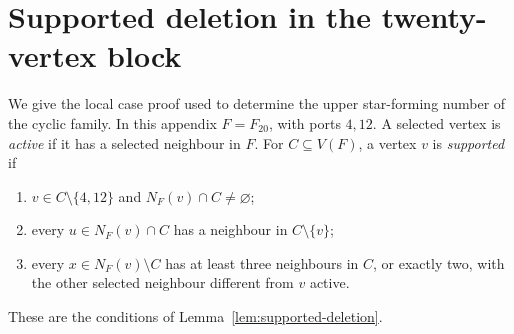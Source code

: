 \section{Supported deletion in the twenty-vertex block}\label{app:twenty-support}

We give the local case proof used to determine the upper star-forming number
of the cyclic family. In this appendix $F=F_{20}$, with ports $4,12$.
A selected vertex is \emph{active} if it has a selected neighbour in $F$.
For $C\subseteq V(F)$, a vertex $v$ is \emph{supported} if
\begin{enumerate}
\item $v\in C\setminus\{4,12\}$ and $N_F(v)\cap C\ne\varnothing$;
\item every $u\in N_F(v)\cap C$ has a neighbour in $C\setminus\{v\}$;
\item every $x\in N_F(v)\setminus C$ has at least three neighbours in $C$,
 or exactly two, with the other selected neighbour different from $v$ active.
\end{enumerate}
These are the conditions of Lemma~\ref{lem:supported-deletion}.

